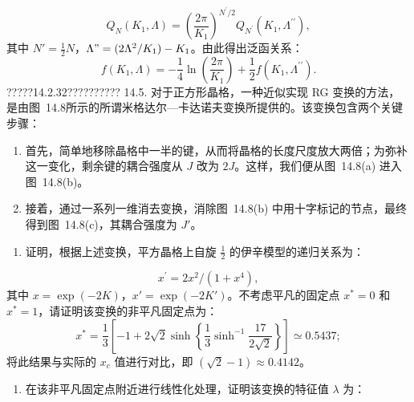 \begin{equation}\tag{14.4.112}\label{eq:14.4.112}
Q _ { N } ( K _ { 1 } , \Lambda ) = \left( \frac { 2 \pi } { K _ { 1 } } \right) ^{N ^ { \prime} / 2 } Q _ { N ^{\prime} } ( K _ { 1 } , \Lambda ^{\prime \prime} ) ,
\end{equation}
其中 \(N' = \frac{1}{2}N\)，\(\Lambda" = (2\Lambda^2/K_1) - K_1\)。由此得出泛函关系：
\begin{equation}\tag{14.4.113}\label{eq:14.4.113}
f ( K _ { 1 } , \Lambda ) = - \frac { 1 } { 4 } \ln \left( \frac { 2 \pi } { K _ { 1 } } \right) + \frac { 1 } { 2 } f ( K _ { 1 } , \Lambda ^{\prime \prime} ) .
\end{equation}
?????14.2.32??????????
14.5. 对于正方形晶格，一种近似实现 RG 变换的方法，是由图~14.8所示的所谓米格达尔---卡达诺夫变换所提供的。该变换包含两个关键步骤：
\begin{enumerate}
\def\labelenumi{(\roman{enumi})}
\item
  首先，简单地移除晶格中一半的键，从而将晶格的长度尺度放大两倍；为弥补这一变化，剩余键的耦合强度从 \(J\) 改为 \(2J\)。这样，我们便从图~14.8(a) 进入图~14.8(b)。
\item
  接着，通过一系列一维消去变换，消除图~14.8(b) 中用十字标记的节点，最终得到图~14.8(c)，其耦合强度为 \(J'\)。
\end{enumerate}
\begin{enumerate}
\def\labelenumi{(\alph{enumi})}
\item
  证明，根据上述变换，平方晶格上自旋 \(\frac{1}{2}\) 的伊辛模型的递归关系为：
\end{enumerate}
\begin{equation}\tag{14.4.114}\label{eq:14.4.114}
x ^{\prime} = 2 x ^{2} / ( 1 + x ^{4} ) ,
\end{equation}
其中 \(x = \exp(-2K)\)，\(x' = \exp(-2K')\)。不考虑平凡的固定点 \(x^* = 0\) 和 \(x^* = 1\)，请证明该变换的非平凡固定点为：
\begin{equation}\tag{14.4.115}\label{eq:14.4.115}
x ^{*} = \frac { 1 } { 3 } \left[ - 1 + 2 \sqrt { 2 } \sinh \left\{ \frac { 1 } { 3 } \sinh ^{- 1} \frac { 17 } { 2 \sqrt { 2 } } \right\} \right] \simeq 0 . 54 37 ;
\end{equation}
将此结果与实际的 \(x_{c}\) 值进行对比，即 \((\sqrt{2} - 1) \approx 0.4142\)。
\begin{enumerate}
\def\labelenumi{(\alph{enumi})}
\setcounter{enumi}{1}
\item
  在该非平凡固定点附近进行线性化处理，证明该变换的特征值 \(\lambda\) 为：
\end{enumerate}
